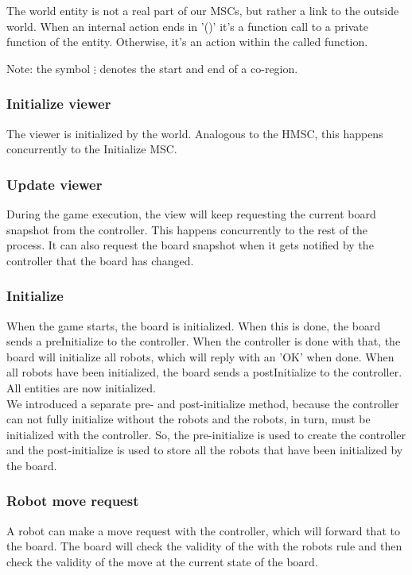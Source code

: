 	The world entity is not a real part of our MSCs, but rather a link to the outside world. When an internal action ends in '()' it's a function call to a private function of the entity. Otherwise, it's an action within the called function.

	Note: the symbol $\vdots$ denotes the start and end of a co-region.

	\subsubsection{Initialize viewer}
	The viewer is initialized by the world. Analogous to the HMSC, this happens concurrently to the Initialize MSC.
	
	

    	\subsubsection{Update viewer}
	During the game execution, the view will keep requesting the current board snapshot from the controller. This happens concurrently to the rest of the process. It can also request the board snapshot when it gets notified by the controller that the board has changed.
    	
	

	\subsubsection{Initialize}
	When the game starts, the board is initialized. When this is done, the board sends a preInitialize to the controller. When the controller is done with that, the board will initialize all robots, which will reply with an 'OK' when done. When all robots have been initialized, the board sends a postInitialize to the controller. All entities are now initialized. \\
We introduced a separate pre- and post-initialize method, because the controller can not fully initialize without the robots and the robots, in turn, must be initialized with the controller. So, the pre-initialize is used to create the controller and the post-initialize is used to store all the robots that have been initialized by the board.
  	
	
    	
	\subsubsection{Robot move request}
	A robot can make a move request with the controller, which will forward that to the board. The board will check the validity of the with the robots rule and then check the validity of the move at the current state of the board.

